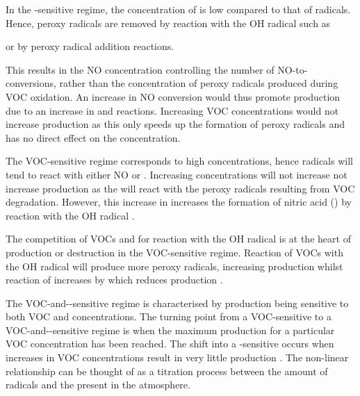 In the -sensitive regime, the concentration of  is low compared to that of radicals. Hence, peroxy radicals 
are removed by reaction with the OH radical such as 
\begin{reactionlist}
\end{reactionlist}
or by peroxy radical addition reactions.
\begin{reactionlist}
\end{reactionlist}
This results in the NO concentration controlling the number of NO-to- conversions, rather than the concentration of 
peroxy radicals produced during VOC oxidation. An increase in NO conversion would thus promote  production due to an 
increase in  and  reactions. Increasing VOC concentrations would not increase 
 production as this only speeds up the formation of peroxy radicals and has no direct effect on the  
concentration.

The VOC-sensitive regime corresponds to high  concentrations, hence radicals will tend to react with either NO or 
. Increasing  concentrations will not increase not increase  production as the  will react 
with the peroxy radicals resulting from VOC degradation. However, this increase in  increases the formation of nitric 
acid () by reaction with the OH radical \citep{Kleinman:1991, Kleinman:1994, Kirchner:2001}.
\begin{reactionlist}
\end{reactionlist}
The competition of VOCs and  for reaction with the OH radical is at the heart of  production or destruction in 
the VOC-sensitive regime. Reaction of VOCs with the OH radical will produce more peroxy radicals, increasing  production
whilst reaction of  increases  by  which reduces  production 
\citep{Kleinman:1991, Kleinman:1994, Kirchner:2001}.

The VOC-and--sensitive regime is characterised by  production being sensitive to both VOC and  
concentrations. The turning point from a VOC-sensitive to a VOC-and--sensitive regime is when the maximum  
production for a particular VOC concentration has been reached. The shift into a -sensitive occurs when increases in 
VOC concentrations result in very little  production \citep{Kirchner:2001}. The non-linear relationship can be thought of
as a titration process between the amount of radicals and the  present in the atmosphere.

